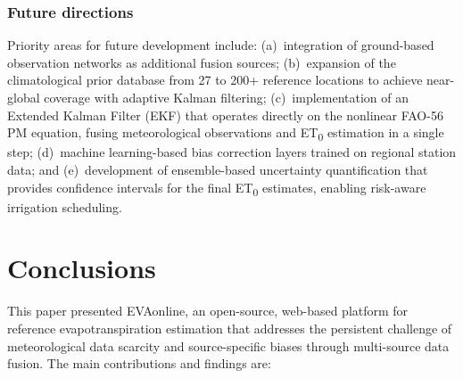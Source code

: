 \documentclass[preprint,review,12pt]{elsarticle}
\begin{document}
\subsubsection*{Future directions}

Priority areas for future development include: (a)~integration of ground-based
observation networks as additional fusion sources; (b)~expansion of the
climatological prior database from 27 to 200+ reference locations to achieve
near-global coverage with adaptive Kalman filtering; (c)~implementation of an
Extended Kalman Filter (EKF) that operates directly on the nonlinear FAO-56 PM
equation, fusing meteorological observations and ET\textsubscript{0} estimation
in a single step; (d)~machine learning-based bias correction layers trained on
regional station data; and (e)~development of ensemble-based uncertainty
quantification that provides confidence intervals for the final
ET\textsubscript{0} estimates, enabling risk-aware irrigation scheduling.


\section{Conclusions}
\label{sec:conclusions}

This paper presented EVAonline, an open-source, web-based platform for
reference evapotranspiration estimation that addresses the persistent challenge
of meteorological data scarcity and source-specific biases through multi-source
data fusion. The main contributions and findings are:
\end{document}
